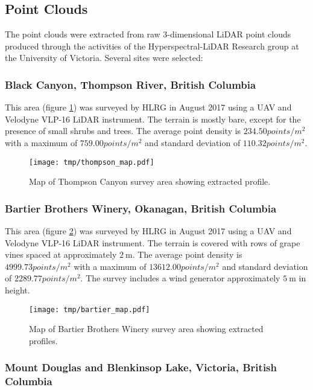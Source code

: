 \documentclass[doc]{apa6}
\begin{document}
\subsection{Point Clouds}

The point clouds were extracted from raw 3-dimensional LiDAR point clouds produced through the activities of the Hyperspectral-LiDAR Research group at the University of Victoria. Several sites were selected:

\subsubsection{Black Canyon, Thompson River, British Columbia}

This area (figure \ref{fig:thompson_map}) was surveyed by HLRG in August 2017 using a UAV and Velodyne VLP-16 LiDAR instrument. The terrain is mostly bare, except for the presence of small shrubs and trees. The average point density is $234.50points/m^2$ with a maximum of $759.00points/m^2$ and standard deviation of $110.32points/m^2$.

\begin{figure} %
\texttt{[image: tmp/thompson\_map.pdf]} 
\caption{Map of Thompson Canyon survey area showing extracted profile.}
\label{fig:thompson_map}
\end{figure}


\subsubsection{Bartier Brothers Winery, Okanagan, British Columbia}

This area (figure \ref{fig:bartier_map}) was surveyed by HLRG in August 2017 using a UAV and Velodyne VLP-16 LiDAR instrument. The terrain is covered with rows of grape vines spaced at approximately $\SI{2}\m$. The average point density is $4999.73points/m^2$ with a maximum of $13612.00points/m^2$ and standard deviation of $2289.77points/m^2$. The survey includes a wind generator approximately $\SI{5}\m$ in height.

\begin{figure} %
\texttt{[image: tmp/bartier\_map.pdf]} 
\caption{Map of Bartier Brothers Winery survey area showing extracted profiles.}
\label{fig:bartier_map}
\end{figure}


\subsubsection{Mount Douglas and Blenkinsop Lake, Victoria, British Columbia}
\end{document}

